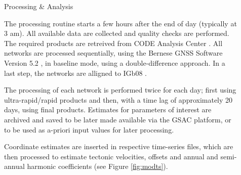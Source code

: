 \documentclass[final,a0,portrait]{beamer}
\newlength{\sepwid}
\newlength{\onecolwid}
\begin{document}
\begin{frame}[t]
\begin{columns}[t]
\begin{column}{\onecolwid}


\end{column} %


\begin{column}{\sepwid}\end{column} %

\begin{column}{\onecolwid} %


\begin{block}{Processing \& Analysis}

{\small
The processing routine starts a few hours after the end of day (typically at 3 am). All available data are collected and quality 
checks are performed. The required products are retreived from CODE Analysis Center \cite{codeac}.
All networks are processed sequentially, using the Bernese GNSS Software Version 5.2 \cite{bernese}, in baseline mode, 
using a double-difference approach. In a last step, the networks are alligned to IGb08 \cite{igb08}.

The processing of each network is performed twice for each day; first using ultra-rapid/rapid products and then, with a time 
lag of approximately 20 days, using final products. Estimates for parameters of interest are archived and saved to be later 
made available via the GSAC platform, or to be used as a-priori input values for later processing.

Coordinate estimates are inserted in respective time-series files, which are then processed to estimate tectonic velocities, 
offsets and annual and semi-annual harmonic coefficients (see Figure \ref{fig:modts}).

}
\end{block}
\end{column}
\end{columns}
\end{frame}
\end{document}

